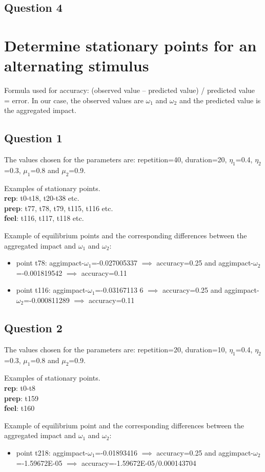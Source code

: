 \documentclass[a4paper]{article}
\begin{document}
\subsection{Question 4}

\section{Determine stationary points for an alternating stimulus}

Formula used for accuracy: (observed value – predicted value) / predicted value = error. In our case, the observed values are $\omega_{1}$ and $\omega_{2}$ and the predicted value is the aggregated impact.

\subsection{Question 1}

The values chosen for the parameters are: repetition=40, duration=20, $\eta_{1}$=0.4, $\eta_{2}$=0.3, $\mu_{1}$=0.8 and $\mu_{2}$=0.9.

Examples of stationary points. \\
\textbf{rep}: t0-t18, t20-t38 etc. \\
\textbf{prep}: t77, t78, t79, t115, t116 etc.	\\
\textbf{feel}: t116, t117, t118 etc.

Example of equilibrium points and the corresponding differences between the aggregated impact and $\omega_{1}$ and $\omega_{2}$:
\begin{itemize}
\item point t78: aggimpact-$\omega_{1}$=-0.027005337 $\implies$ accuracy=0.25 and aggimpact-$\omega_{2}$=-0.001819542 $\implies$ accuracy=0.11 
\item point t116: aggimpact-$\omega_{1}$=-0.03167113 6 $\implies$ accuracy=0.25 and aggimpact-$\omega_{2}$=-0.000811289 $\implies$ accuracy=0.11
\end{itemize}

\subsection{Question 2}

The values chosen for the parameters are: repetition=20, duration=10, $\eta_{1}$=0.4, $\eta_{2}$=0.3, $\mu_{1}$=0.8 and $\mu_{2}$=0.9.

Examples of stationary points. \\
\textbf{rep}: t0-t8 \\
\textbf{prep}: t159 	\\
\textbf{feel}: t160

Example of equilibrium point and the corresponding differences between the aggregated impact and $\omega_{1}$ and $\omega_{2}$:
\begin{itemize}
\item point t218: aggimpact-$\omega_{1}$=-0.01893416 $\implies$ accuracy=0.25 and aggimpact-$\omega_{2}$=-1.59672E-05 $\implies$ accuracy=-1.59672E-05/0.000143704
\end{itemize} 
\end{document}
